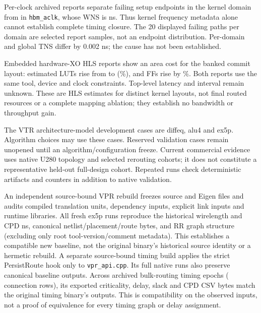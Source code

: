 \documentclass[10pt]{article}
\begin{document}
Per-clock archived reports separate \KernelFailingSetup{} failing setup
endpoints in the kernel domain from \HBMFailingSetup{} in
\texttt{hbm\_aclk}, whose WNS is \HBMWorstSlack{} ns. Thus kernel
frequency metadata alone cannot establish complete timing closure. The
20 displayed failing paths per domain are selected report samples, not
an endpoint distribution. Per-domain and global TNS differ by 0.002 ns;
the cause has not been established.


Embedded hardware-XO HLS reports show an area cost for the banked
commit layout: estimated LUTs rise from \CommitUnbankedLUT{} to
\CommitBankedLUT{} (\CommitLUTIncrease{}\%), and FFs rise by
\CommitFFIncrease{}\%. Both reports use the same tool, device and clock
constraints. Top-level latency and interval remain unknown. These are HLS
estimates for distinct kernel layouts, not final routed resources or a
complete mapping ablation; they establish no bandwidth or throughput gain.

The VTR architecture-model development cases are diffeq, alu4 and ex5p.
Algorithm choices may use these cases. Reserved validation cases remain
unopened until an algorithm/configuration freeze. Current commercial evidence
uses native U280 topology and selected rerouting cohorts; it does not constitute
a representative held-out full-design cohort. Repeated runs check
deterministic artifacts and counters in addition to native validation.

An independent source-bound VPR rebuild freezes \VPRFrozenFiles{} source
and Eigen files and audits \VPRCompiledUnits{} compiled translation units,
\VPRDependencyInputs{} dependency inputs, explicit link inputs and runtime
libraries. All \VPRNativeRepeats{} fresh ex5p runs reproduce the historical
wirelength \VPRBaselineWL{} and CPD \VPRBaselineCPD{} ns, canonical
netlist/placement/route bytes, and RR graph structure (excluding only root
tool-version/comment metadata). This establishes a compatible new baseline,
not the original binary's historical source identity or a hermetic rebuild.
A separate source-bound timing build applies the strict PersistRoute hook
only to \texttt{vpr\_api.cpp}. Its \VPRHookNativeRepeats{} full native runs
also preserve canonical baseline outputs. Across \VPRHookEpochs{} archived
bulk-routing timing epochs (\VPRHookRows{} connection rows), its exported
criticality, delay, slack and CPD CSV bytes match the original timing
binary's outputs. This is compatibility on the observed inputs, not a
proof of equivalence for every timing graph or delay assignment.
\end{document}
